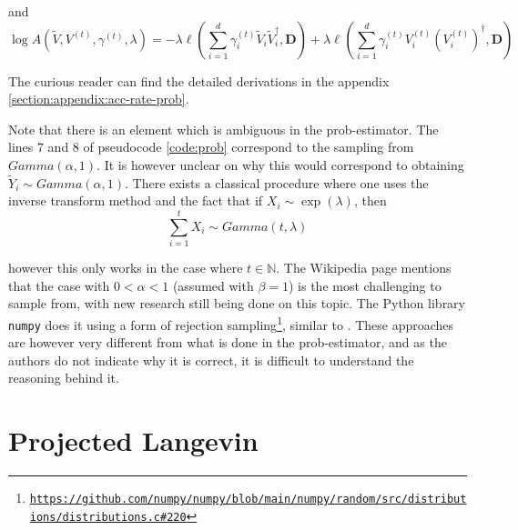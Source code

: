 \documentclass[12pt]{memoir}
\newcommand{\mb}{\mathbf}
\begin{document}
and
\begin{equation}
\log A(\tilde V, V^{(t)}, \gamma^{(t)}, \lambda) = -\lambda \ell(\sum_{i=1}^{d} \gamma_i^{(t)} \tilde V_i \tilde V_i^\dagger, \mb D) + \lambda \ell^{}(\sum_{i=1}^{d} \gamma_i^{(t)} V_i^{(t)} (V_i^{(t)})^\dagger, \mb D)
\end{equation}

The curious reader can find the detailed derivations in the appendix \ref{section:appendix:acc-rate-prob}.\medbreak



 Note that there is an element which is ambiguous in the prob-estimator. The lines 7 and 8 of pseudocode \ref{code:prob} correspond to the sampling from $Gamma(\alpha, 1)$. It is however unclear on why this would correspond to obtaining $\tilde Y_i \sim Gamma(\alpha, 1)$. There exists a classical procedure where one uses the inverse transform method and the fact that if $X_i \sim \exp(\lambda)$, then
\begin{equation}
    \sum_{i=1}^{t} X_i \sim Gamma(t,\lambda)
\end{equation}

however this only works in the case where $t \in \mathbb{N}$. The Wikipedia page \cite{wiki:gamma-dist} mentions that the case with $0 < \alpha < 1$ (assumed with $\beta=1$) is the most challenging to sample from, with new research \cite{mcmc:gamma-sampling:liu2015simulating} still being done on this topic. The Python library \texttt{numpy} \cite{numpy:harris2020array} does it using a form of rejection sampling\footnote{\texttt{\url{https://github.com/numpy/numpy/blob/main/numpy/random/src/distributions/distributions.c\#220}}}, similar to \cite{mcmc:gamma-sampling:liu2015simulating}. These approaches are however very different from what is done in the prob-estimator, and as the authors do not indicate why it is correct, it is difficult to understand the reasoning behind it.


\newpage

\section{Projected Langevin}\label{section:projected-langevin}
\end{document}
